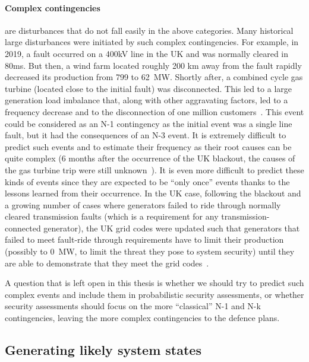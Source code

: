 \paragraph*{Complex contingencies} are disturbances that do not fall easily in the above categories. Many historical large disturbances were initiated by such complex contingencies. For example, in 2019, a fault occurred on a 400kV line in the UK and was normally cleared in 80ms. But then, a wind farm located roughly 200 km away from the fault rapidly decreased its production from 799 to 62~MW. Shortly after, a combined cycle gas turbine (located close to the initial fault) was disconnected. This led to a large generation load imbalance that, along with other aggravating factors, led to a frequency decrease and to the disconnection of one million customers~\cite{2019UKBlackout}. This event could be considered as an N-1 contingency as the initial event was a single line fault, but it had the consequences of an N-3 event. It is extremely difficult to predict such events and to estimate their frequency as their root causes can be quite complex (6 months after the occurrence of the UK blackout, the causes of the gas turbine trip were still unknown~\cite{2019UKBlackout}). It is even more difficult to predict these kinds of events since they are expected to be ``only once'' events thanks to the lessons learned from their occurrence. In the UK case, following the blackout and a growing number of cases where generators failed to ride through normally cleared transmission faults (which is a requirement for any transmission-connected generator), the UK grid codes were updated such that generators that failed to meet fault-ride through requirements have to limit their production (possibly to 0~MW, to limit the threat they pose to system security) until they are able to demonstrate that they meet the grid codes~\cite{FaultRideThroughEnforcement}.


A question that is left open in this thesis is whether we should try to predict such complex events and include them in probabilistic security assessments, or whether security assessments should focus on the more ``classical'' N-1 and N-k contingencies, leaving the more complex contingencies to the defence plans.


\subsection{Generating likely system states}
\label{sec:init_state}


